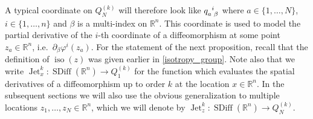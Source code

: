 \documentclass[12pt]{amsart}
\newcommand{\R}{\ensuremath{\mathbb{R}}}
\DeclareMathOperator{\SDiff}{SDiff}
\DeclareMathOperator{\Jet}{Jet}
\DeclareMathOperator{\iso}{iso}
\begin{document}
  A typical coordinate on $Q^{(k)}_N$ will therefore look
  like $q\indices{_a^i_\beta}$ where $a \in \{1,\dots,N\}$, $i \in \{ 1 , \dots, n \}$
  and $\beta$ is a multi-index on $\R^n$.
  This coordinate is used to model the partial derivative of the $i$-th coordinate
  of a diffeomorphism at some point $z_a \in \R^n$, i.e.\ $\partial_\beta \varphi^i(z_a)$.
  For the statement of the next proposition, recall that the definition  of $\iso(z)$ was given earlier in \eqref{isotropy_group}. Note also that we write $\Jet^k_x: \SDiff(\R^n) \to Q_1^{(k)}$ for
    the function which evaluates the spatial derivatives
    of a diffeomorphism up to order $k$ at the location $x \in \R^n$. In the subsequent sections we will also use the obvious generalization to multiple locations $z_1, \ldots, z_N \in \R^n$, which we will denote by $\Jet^k_z : \SDiff(\R^n) \to Q_N^{(k)}$.  
\end{document}
